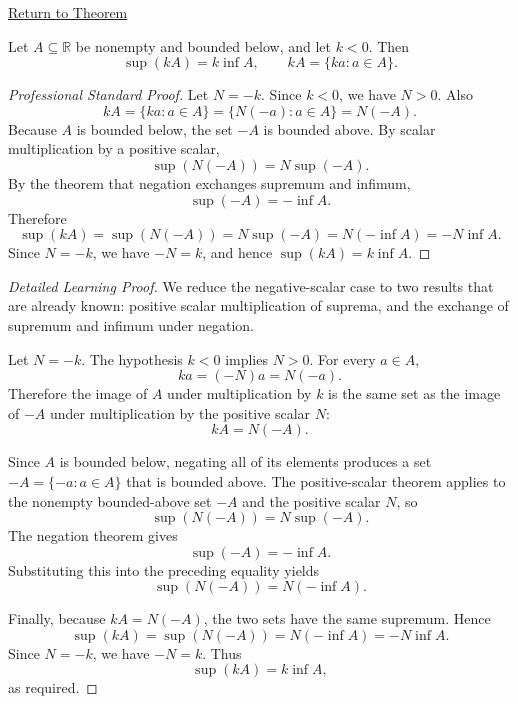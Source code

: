 \newpage
{}
\label{prf:scalar-mult-negative}

\begin{remark*}[Return]
\hyperref[thm:scalar-mult-negative]{Return to Theorem}
\end{remark*}


\begin{theorem*}
Let $A\subseteq\mathbb{R}$ be nonempty and bounded below, and let $k<0$. Then
\[
  \sup(kA)=k\inf A,
  \qquad
  kA=\{ka:a\in A\}.
\]
\end{theorem*}

\begin{proof}[Professional Standard Proof]
\LRAProofBodyStart
Let $N=-k$. Since $k<0$, we have $N>0$. Also
\[
  kA=\{ka:a\in A\}=\{N(-a):a\in A\}=N(-A).
\]
Because $A$ is bounded below, the set $-A$ is bounded above. By scalar
multiplication by a positive scalar,
\[
  \sup(N(-A))=N\sup(-A).
\]
By the theorem that negation exchanges supremum and infimum,
\[
  \sup(-A)=-\inf A.
\]
Therefore
\[
  \sup(kA)=\sup(N(-A))=N\sup(-A)=N(-\inf A)=-N\inf A.
\]
Since $N=-k$, we have $-N=k$, and hence $\sup(kA)=k\inf A$.
\end{proof}

\begin{proof}[Detailed Learning Proof]
\LRAProofBodyStart
We reduce the negative-scalar case to two results that are already known:
positive scalar multiplication of suprema, and the exchange of supremum and
infimum under negation.

Let $N=-k$. The hypothesis $k<0$ implies $N>0$. For every $a\in A$,
\[
  ka=(-N)a=N(-a).
\]
Therefore the image of $A$ under multiplication by $k$ is the same set as the
image of $-A$ under multiplication by the positive scalar $N$:
\[
  kA=N(-A).
\]

Since $A$ is bounded below, negating all of its elements produces a set
$-A=\{-a:a\in A\}$ that is bounded above. The positive-scalar theorem applies
to the nonempty bounded-above set $-A$ and the positive scalar $N$, so
\[
  \sup(N(-A))=N\sup(-A).
\]
The negation theorem gives
\[
  \sup(-A)=-\inf A.
\]
Substituting this into the preceding equality yields
\[
  \sup(N(-A))=N(-\inf A).
\]

Finally, because $kA=N(-A)$, the two sets have the same supremum. Hence
\[
  \sup(kA)=\sup(N(-A))=N(-\inf A)=-N\inf A.
\]
Since $N=-k$, we have $-N=k$. Thus
\[
  \sup(kA)=k\inf A,
\]
as required.
\end{proof}

